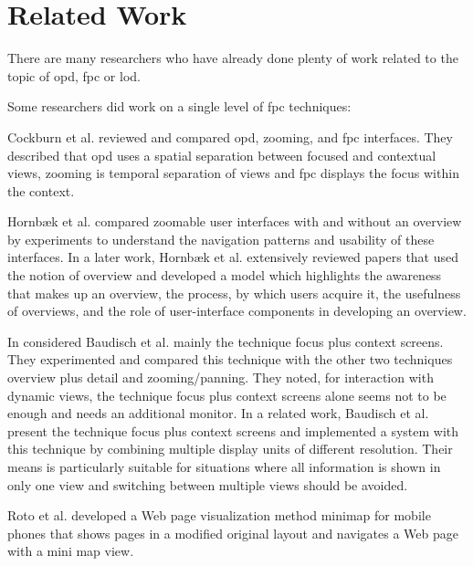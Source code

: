
\section{Related Work}

There are many researchers who have already done plenty of work related to the topic of \gls{opd}, \gls{fpc} or \gls{lod}.

Some researchers did work on a single level of \gls{fpc} techniques:

Cockburn et al. \cite{cockburn2006review}\cite{cockburn2009review} reviewed and compared \gls{opd}, zooming, and \gls{fpc} interfaces. They described that \gls{opd} uses a spatial separation between focused and contextual views, zooming is temporal separation of views and \gls{fpc} displays the focus within the context.

Hornb{\ae}k et al. \cite{hornbaek2002navigation} compared zoomable user interfaces with and without an overview by experiments to understand the navigation patterns and usability of these interfaces. In a later work, Hornb{\ae}k et al. \cite{hornbaek2011notion} extensively reviewed papers that used the notion of overview and developed a model which highlights the awareness that makes up an overview, the process, by which users acquire it, the usefulness of overviews, and the role of user-interface components in developing an overview.

In \cite{baudisch2002keeping} considered Baudisch et al. mainly the technique focus plus context screens. They experimented and compared this technique with the other two techniques overview plus detail and zooming/panning. They noted, for interaction with dynamic views, the technique focus plus context screens alone seems not to be enough and needs an additional monitor. In a related work, Baudisch et al. \cite{baudisch2001focus} present the technique focus plus context screens and implemented a system with this technique by combining multiple display units of different resolution. Their means is particularly suitable for situations where all information is shown in only one view and switching between multiple views should be avoided.

Roto et al. \cite{roto2006minimap} developed a Web page visualization method minimap for mobile phones that shows pages in a modified original layout and navigates a Web page with a mini map view.

